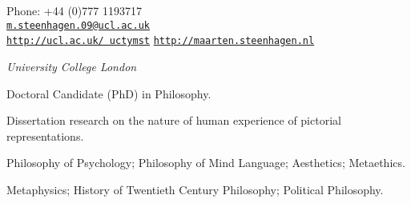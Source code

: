 \documentclass[11pt]{article}
\makeatletter
\def\myemail{m.steenhagen.09@ucl.ac.uk}
\def\myweb{http://ucl.ac.uk/\string~uctymst}
\def\myblog{http://maarten.steenhagen.nl}
\def\myphone{+44 (0)777 1193717}
\makeatother
\begin{document}
\begin{minipage}[t]{2.95in}
  
\end{minipage}
\hfill     
\hfill
\begin{minipage}[t]{1.7in}
  \flushright \footnotesize Phone: \myphone \\  
  {\scriptsize  \texttt{\href{mailto:\myemail}{\myemail}}} \\
  {\scriptsize  \texttt{\href{\myweb}{\myweb}}}
	{\scriptsize  \texttt{\href{\myblog}{\myblog}}}
\end{minipage}


\vfil

\reversemarginpar

\bigskip       

\medskip


\noindent\emph{University College London \vspace{0.01in}}

\ind Doctoral Candidate (PhD) in Philosophy.

\ind Dissertation research on the nature of human experience of pictorial representations.  

\bigskip


\ind Philosophy of Psychology; Philosophy of Mind \amper Language; Aesthetics; Metaethics.

\bigskip
\bigskip


\ind Metaphysics; History of Twentieth Century Philosophy; Political Philosophy. 

\bigskip
\bigskip
\vfil 
{}
\end{document}
